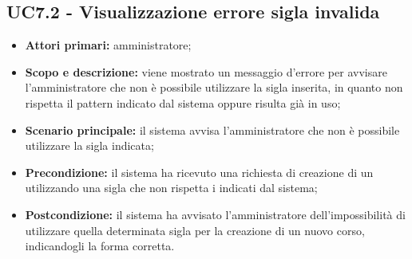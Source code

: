 \documentclass[AnalisiDeiRequisiti.tex]{subfiles}
\begin{document}
\subsection{UC7.2 - Visualizzazione errore sigla invalida}
\begin{itemize}
	\item \textbf{Attori primari:} amministratore;
	\item \textbf{Scopo e descrizione:} viene mostrato un messaggio d'errore per avvisare l'amministratore che non è possibile utilizzare la sigla inserita, in quanto non rispetta il pattern indicato dal sistema oppure risulta già in uso;
	\item \textbf{Scenario principale:} il sistema avvisa l'amministratore che non è possibile utilizzare la sigla indicata;
	\item \textbf{Precondizione:} il sistema ha ricevuto una richiesta di creazione di un  utilizzando una sigla che non rispetta i  indicati dal sistema; 
	\item \textbf{Postcondizione:} il sistema ha avvisato l'amministratore dell'impossibilità di utilizzare quella determinata sigla per la creazione di un nuovo corso, indicandogli la forma corretta.
\end{itemize}

\end{document}
